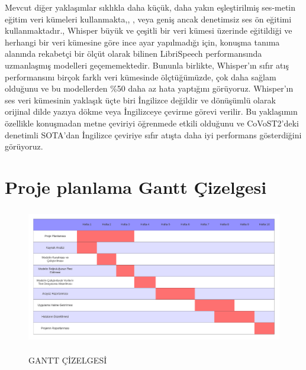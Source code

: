 \documentclass{article}
\begin{document}
	Mevcut diğer yaklaşımlar sıklıkla daha küçük, daha yakın eşleştirilmiş ses-metin eğitim veri kümeleri kullanmakta,\cite{DBLP:journals/corr/abs-2104-02133}, \cite{DBLP:journals/corr/abs-2111-09344},\cite{DBLP:journals/corr/abs-2106-06909} veya geniş ancak denetimsiz ses ön eğitimi kullanmaktadır.\cite{DBLP:journals/corr/abs-2006-11477}, \cite{Zhang_2022} Whisper büyük ve çeşitli bir veri kümesi üzerinde eğitildiği ve herhangi bir veri kümesine göre ince ayar yapılmadığı için, konuşma tanıma alanında rekabetçi bir ölçüt olarak bilinen LibriSpeech performansında uzmanlaşmış modelleri geçememektedir. Bununla birlikte, Whisper'ın sıfır atış performansını birçok farklı veri kümesinde ölçtüğümüzde, çok daha sağlam olduğunu ve bu modellerden \%50 daha az hata yaptığını görüyoruz.
	Whisper'ın ses veri kümesinin yaklaşık üçte biri İngilizce değildir ve dönüşümlü olarak orijinal dilde yazıya dökme veya İngilizceye çevirme görevi verilir. Bu yaklaşımın özellikle konuşmadan metne çeviriyi öğrenmede etkili olduğunu ve CoVoST2'deki denetimli SOTA'dan İngilizce çeviriye sıfır atışta daha iyi performans gösterdiğini görüyoruz.
	
	\section{Proje planlama Gantt Çizelgesi}
	\begin{figure}[!htbp]
		\caption{GANTT ÇİZELGESİ}
		\centering
		\includegraphics[width=15cm,
		height=6cm,
		keepaspectratio]{ganttchart.png}
		\label{gantt}
	\end{figure}
	\newpage
	


 
\end{document}
